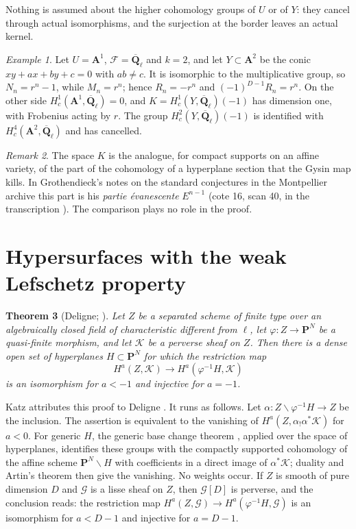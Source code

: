 \documentclass[11pt,a4paper]{article}
\theoremstyle{plain}
\newtheorem{theorem}{Theorem}
\theoremstyle{remark}
\newtheorem{example}[theorem]{Example}
\newtheorem{remark}[theorem]{Remark}
\newcommand{\Ql}{\overline{\mathbf Q}_\ell}
\newcommand{\A}{\mathbf A}
\newcommand{\F}{\mathcal F}
\newcommand{\G}{\mathcal G}
\begin{document}
Nothing is assumed about the higher cohomology groups of $U$ or of $Y$: they cancel through actual isomorphisms, and
the surjection at the border leaves an actual kernel.

\begin{example}
Let $U=\A^1$, $\F=\Ql$ and $k=2$, and let $Y\subset\A^2$ be the conic $xy+ax+by+c=0$ with $ab\ne c$. It is
isomorphic to the multiplicative group, so $N_n=r^n-1$, while $M_n=r^n$; hence $R_n=-r^n$ and
$(-1)^{D-1}R_n=r^n$. On the other side $H^1_c(\A^1,\Ql)=0$, and $K=H^1_c(Y,\Ql)(-1)$ has dimension one, with
Frobenius acting by $r$. The group $H^2_c(Y,\Ql)(-1)$ is identified with $H^4_c(\A^2,\Ql)$ and has cancelled.
\end{example}

\begin{remark}
The space $K$ is the analogue, for compact supports on an affine variety, of the part of the cohomology of a
hyperplane section that the Gysin map kills. In Grothendieck's notes on the standard conjectures in the Montpellier
archive this part is his \emph{partie \'evanescente} $E^{n-1}$ (cote 16, scan 40, in the transcription
\cite{Archive}). The comparison plays no role in the proof.
\end{remark}

\section{Hypersurfaces with the weak Lefschetz property}\label{sec:lefschetz}

\begin{theorem}[Deligne; {\cite[Appendix, A.5, with A.3 and A.4]{KatzACT}}]\label{thm:deligne}
Let $Z$ be a separated scheme of finite type over an algebraically closed field of characteristic different from
$\ell$, let $\varphi:Z\to\mathbf P^N$ be a quasi-finite morphism, and let $\mathcal K$ be a perverse sheaf on $Z$.
Then there is a dense open set of hyperplanes $H\subset\mathbf P^N$ for which the restriction map
\[
H^a(Z,\mathcal K)\longrightarrow H^a(\varphi^{-1}H,\mathcal K)
\]
is an isomorphism for $a<-1$ and injective for $a=-1$.
\end{theorem}

Katz attributes this proof to Deligne \cite[p.~152]{KatzACT}. It runs as follows. Let
$\alpha:Z\smallsetminus\varphi^{-1}H\to Z$ be the inclusion. The assertion is equivalent to the vanishing of
$H^a(Z,\alpha_!\alpha^*\mathcal K)$ for $a<0$. For generic $H$, the generic base change theorem
\cite[Th\'eor\`emes de finitude, 1.9]{SGA4h}, applied over the space of hyperplanes, identifies these groups with
the compactly supported cohomology of the affine scheme $\mathbf P^N\smallsetminus H$ with coefficients in a direct
image of $\alpha^*\mathcal K$; duality and Artin's theorem then give the vanishing. No weights occur. If $Z$ is
smooth of pure dimension $D$ and $\G$ is a lisse sheaf on $Z$, then $\G[D]$ is perverse, and the conclusion reads:
the restriction map $H^a(Z,\G)\to H^a(\varphi^{-1}H,\G)$ is an isomorphism for $a<D-1$ and injective for $a=D-1$.
\end{document}
